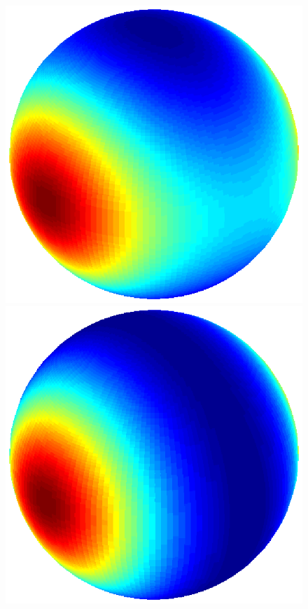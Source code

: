\documentclass[dvips,aoas,preprint]{imsart}
\numberwithin{equation}{section}
\theoremstyle{plain}
\begin{document}
\begin{figure}[!htbp]
\begin{minipage}[]{0.12\textwidth}
    \end{minipage}
    \begin{minipage}[]{0.12\textwidth}
      \centering
      \includegraphics*[width=\textwidth]{figure3b1.eps}
    \end{minipage}
    \begin{minipage}[]{0.12\textwidth}
      \centering
      \includegraphics*[width=\textwidth]{figure3a1.eps}

\end{minipage}
\end{figure}
\end{document}

